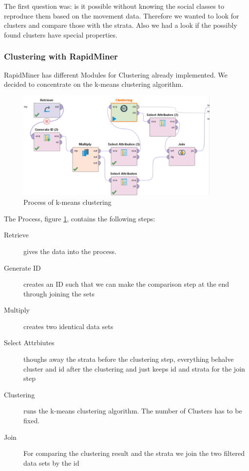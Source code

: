 \setlength{\parindent}{0em}
The first question was: is it possible without knowing the social classes to reproduce them based on the movement data. Therefore we wanted to look for clusters and compare those with the strata. Also we had a look if the possibly found clusters have special properties.

\subsubsection{Clustering with RapidMiner}

RapidMiner has different Modules for Clustering already implemented. We decided to concentrate on the k-means clustering algorithm.
\begin{figure}[!htbp]
\centering
\includegraphics[width=0.9\textwidth]{ClusteringRapid.PNG}
\caption{Process of k-means clustering}
\label{fig: kclust}
\end{figure}


The Process, figure \ref{fig: kclust}, contains the following steps:
\begin{description}
	\item[Retrieve] gives the data into the process. 
  \item[Generate ID] creates an ID such that we can make the comparison step at the end through joining the sets
  \item[Multiply] creates two identical data sets
  \item[Select Attrbiutes] thoughs away the strata before the clustering step, everything behalve cluster and id after the clustering and just keeps id and strata for the join step
	\item[Clustering] runs the k-means clustering algorithm. The number of Clusters has to be fixed.
	\item[Join] For comparing the clustering result and the strata we join the two filtered data sets by the id
\end{description}


